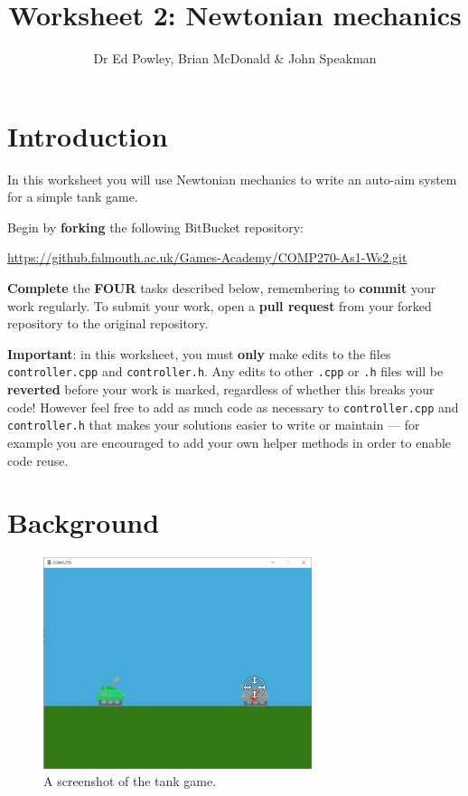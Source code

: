 \documentclass{../../../fal_assignment}
\title{Worksheet 2: Newtonian mechanics}
\author{Dr Ed Powley, Brian McDonald \& John Speakman}
\begin{document}
\maketitle

\section*{Introduction}

In this worksheet you will use Newtonian mechanics to write an auto-aim system for a simple tank game.

Begin by \textbf{forking} the following BitBucket repository:

\begin{center}
	\url{https://github.falmouth.ac.uk/Games-Academy/COMP270-As1-Ws2.git}
\end{center}

\textbf{Complete} the \textbf{FOUR} tasks described below, remembering to \textbf{commit} your work regularly.
To submit your work, open a \textbf{pull request} from your forked repository to the original repository.

\textbf{Important}: in this worksheet, you must \textbf{only} make edits to the files \texttt{controller.cpp} and \texttt{controller.h}.
Any edits to other \texttt{.cpp} or \texttt{.h} files will be \textbf{reverted} before your work is marked, regardless of whether this breaks your code!
However feel free to add as much code as necessary to \texttt{controller.cpp} and \texttt{controller.h} that makes your solutions easier to write or maintain ---
for example you are encouraged to add your own helper methods in order to enable code reuse.

\section*{Background}

\begin{figure}[ht]
	\begin{center}
		\includegraphics[width=0.7\textwidth]{game}
	\end{center}
	\caption{A screenshot of the tank game.}
	\label{fig:game}
\end{figure}
\end{document}
